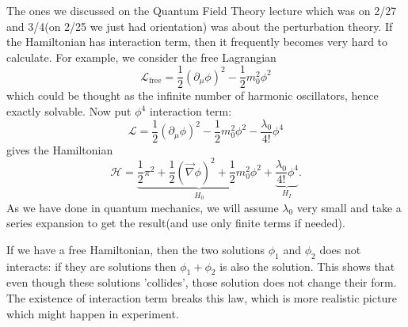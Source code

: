 The ones we discussed on the Quantum Field Theory lecture which was on 2/27 and 3/4(on 2/25 we just had orientation) was about the perturbation theory. If the Hamiltonian has interaction term, then it frequently becomes very hard to calculate. For example, we consider the free Lagrangian
\begin{equation}
\mathcal{L}_{\mathrm{free}}=\frac{1}{2}\left(\partial_\mu \phi\right)^2-\frac{1}{2}m_0^2 \phi^2
\end{equation}
which could be thought as the infinite number of harmonic oscillators, hence exactly solvable. Now put $\phi^4$ interaction term:
\begin{equation}
\mathcal{L}=\frac{1}{2}\left(\partial_\mu \phi\right)^2-\frac{1}{2}m_0^2 \phi^2-\frac{\lambda_0}{4!}\phi^4
\end{equation}
gives the Hamiltonian
\begin{equation}
\mathcal{H}=\underbrace{\frac{1}{2}\pi^2+\frac{1}{2}\left(\vec{\nabla}\phi\right)^2+\frac{1}{2}m_0^2\phi^2}_{H_0}+\underbrace{\frac{\lambda_0}{4!}\phi^4}_{H_I}.
\end{equation}
As we have done in quantum mechanics, we will assume $\lambda_0$ very small and take a series expansion to get the result(and use only finite terms if needed).

If we have a free Hamiltonian, then the two solutions $\phi_1$ and $\phi_2$ does not interacts: if they are solutions then $\phi_1+\phi_2$ is also the solution. This shows that even though these solutions 'collides', those solution does not change their form. The existence of interaction term breaks this law, which is more realistic picture which might happen in experiment.

